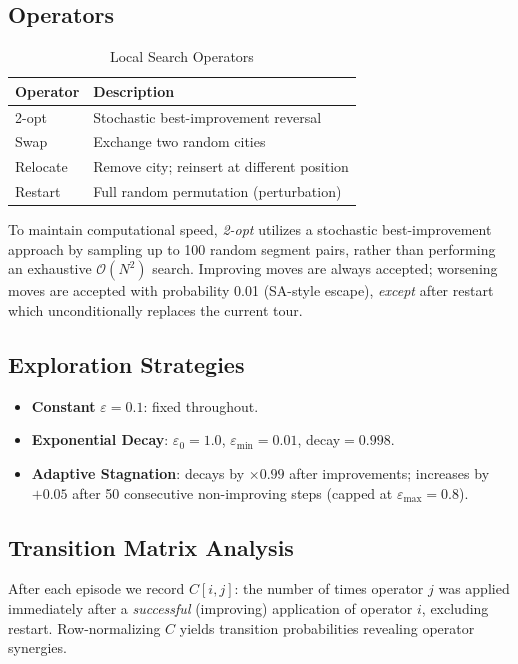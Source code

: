 \documentclass[10pt,twocolumn]{article}
\begin{document}
\subsection{Operators}

\begin{table}[!htbp]
\centering
\caption{Local Search Operators}
\small
\begin{tabular}{ll}
\toprule
\textbf{Operator} & \textbf{Description} \\
\midrule
2-opt & Stochastic best-improvement reversal \\
Swap & Exchange two random cities \\
Relocate & Remove city; reinsert at different position \\
Restart & Full random permutation (perturbation) \\
\bottomrule
\end{tabular}
\end{table}

To maintain computational speed, \emph{2-opt} utilizes a stochastic best-improvement 
approach by sampling up to 100 random segment pairs, rather than performing an exhaustive 
$\mathcal{O}(N^2)$ search. Improving moves are always accepted; worsening moves are accepted with
probability 0.01 (SA-style escape), \emph{except} after restart which
unconditionally replaces the current tour.

\subsection{Exploration Strategies}

\begin{itemize}\itemsep0pt
  \item \textbf{Constant} $\varepsilon=0.1$: fixed throughout.
  \item \textbf{Exponential Decay}: $\varepsilon_0{=}1.0$, $\varepsilon_{\min}{=}0.01$,
        decay$=0.998$.
  \item \textbf{Adaptive Stagnation}: decays by $\times0.99$ after improvements;
        increases by $+0.05$ after 50 consecutive non-improving steps
        (capped at $\varepsilon_{\max}{=}0.8$).
\end{itemize}

\subsection{Transition Matrix Analysis}

After each episode we record $C[i,j]$: the number of times operator $j$ was
applied immediately after a \emph{successful} (improving) application of
operator $i$, excluding restart. Row-normalizing $C$ yields transition
probabilities revealing operator synergies.
\end{document}
